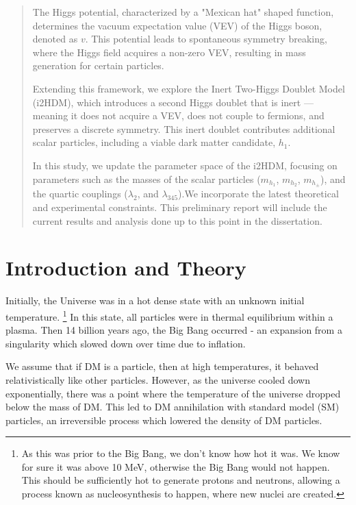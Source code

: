\documentclass[12pt]{article}
\begin{document}
\newpage
\thispagestyle{empty}

\begin{abstract}
The Higgs potential, characterized by a "Mexican hat" shaped function, determines the vacuum expectation value (VEV) of the Higgs boson, denoted as $v$. This potential leads to spontaneous symmetry breaking, where the Higgs field acquires a non-zero VEV, resulting in mass generation for certain particles.

Extending this framework, we explore the Inert Two-Higgs Doublet Model (i2HDM), which introduces a second Higgs doublet that is inert — meaning it does not acquire a VEV, does not couple to fermions, and preserves a discrete symmetry. This inert doublet contributes additional scalar particles, including a viable dark matter candidate, $h_1$.

In this study, we update the parameter space of the i2HDM, focusing on parameters such as the masses of the scalar particles ($m_{h_1}$, $m_{h_2}$, $m_{h_\pm}$), and the quartic couplings ($\lambda_2$, and $\lambda_{345}$).We incorporate the latest theoretical and experimental constraints. This preliminary report will include the current results and analysis done up to this point in the dissertation.
\end{abstract}

\section{Introduction and Theory}
Initially, the Universe was in a hot dense state with an unknown initial temperature. \footnote{As this was prior to the Big Bang, we don't know how hot it was. We know for sure it was above 10 MeV, otherwise the Big Bang would not happen. This should be sufficiently hot to generate protons and neutrons, allowing a process known as nucleosynthesis to happen, where new nuclei are created.} In this state, all particles were in thermal equilibrium within a plasma. Then 14 billion years ago, the Big Bang occurred - an expansion from a singularity which slowed down over time due to inflation.

We assume that if DM is a particle, then at high temperatures, it behaved relativistically like other particles. However, as the universe cooled down exponentially, there was a point where the temperature of the universe dropped below the mass of DM. This led to DM annihilation with standard model (SM) particles, an irreversible process which lowered the density of DM particles. 
\end{document}
